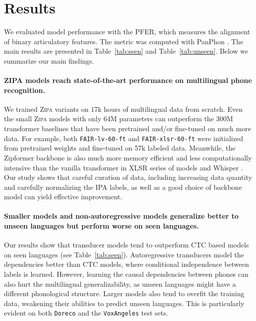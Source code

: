 \documentclass[11pt]{article}
\begin{document}
\section{Results}
We evaluated model performance with the PFER, which measures the alignment of binary articulatory features. The metric was computed with PanPhon \cite{mortensen-etal-2016-panphon}. The main results are presented in Table~\ref{tab:seen} and Table~\ref{tab:unseen}. Below we summarize our main findings. 

\paragraph{ZIPA models reach state-of-the-art performance on multilingual phone recognition.} We trained \textsc{Zipa} variants on 17k hours of multilingual data from scratch. Even the small \textsc{Zipa} models with only 64M parameters can outperform the 300M transformer baselines that have been pretrained and/or fine-tuned on much more data. For example, both \texttt{FAIR-lv-60-ft} and \texttt{FAIR-xlsr-60-ft} \cite{xu22b_interspeech} were initialized from pretrained weights and fine-tuned on 57k labeled data. Meanwhile, the Zipformer backbone is also much more memory efficient and less computationally intensive than the vanilla transformer in XLSR series of models and Whisper \cite{yao2023zipformer}. Our study shows that careful curation of data, including increasing data quantity and carefully normalizing the IPA labels, as well as a good choice of backbone model can yield effective improvement.  

\paragraph{Smaller models and non-autoregressive models generalize better to unseen languages but perform worse on seen languages.} 

Our results show that transducer models tend to outperform CTC based models on seen languages (see Table~\ref{tab:seen}). Autoregressive transducers model the dependencies better than CTC models, where conditional independence between labels is learned. However, learning the causal dependencies between phones can also hurt the multilingual generalizability, as unseen languages might have a different phonological structure. 
Larger models also tend to overfit the training data, weakening their abilities to predict unseen languages. This is particularly evident on both \texttt{Doreco} and the \texttt{VoxAngeles} test sets.  
\end{document}
